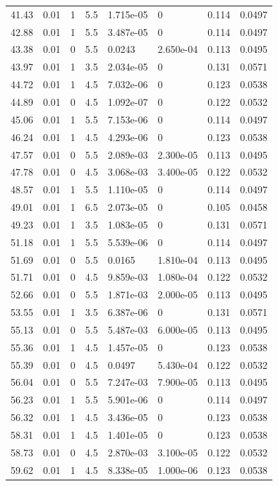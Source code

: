 \documentclass[preview]{standalone}
\begin{document}
{{{\begin{tabular}{L{1.2cm}C{1.2cm} C{0.3cm}C{0.5cm} C{1.4cm}C{1.4cm} C{1.4cm}C{1.4cm}}
  41.43  &  0.01  & 1     & 5.5 &  1.715e-05  & 0  & 0.114 &  0.0497   \\ 
  42.88  &  0.01  & 1     & 5.5 &  3.487e-05  & 0  & 0.114 &  0.0497   \\ 
  43.38  &  0.01  & 0     & 5.5 &  0.0243  & 2.650e-04  & 0.113 &  0.0495   \\ 
  43.97  &  0.01  & 1     & 3.5 &  2.034e-05  & 0  & 0.131 &  0.0571   \\ 
  44.72  &  0.01  & 1     & 4.5 &  7.032e-06  & 0  & 0.123 &  0.0538   \\ 
  44.89  &  0.01  & 0     & 4.5 &  1.092e-07  & 0  & 0.122 &  0.0532   \\ 
  45.06  &  0.01  & 1     & 5.5 &  7.153e-06  & 0  & 0.114 &  0.0497   \\ 
  46.24  &  0.01  & 1     & 4.5 &  4.293e-06  & 0  & 0.123 &  0.0538   \\ 
  47.57  &  0.01  & 0     & 5.5 &  2.089e-03  & 2.300e-05  & 0.113 &  0.0495   \\ 
  47.78  &  0.01  & 0     & 4.5 &  3.068e-03  & 3.400e-05  & 0.122 &  0.0532   \\ 
  48.57  &  0.01  & 1     & 5.5 &  1.110e-05  & 0  & 0.114 &  0.0497   \\ 
  49.01  &  0.01  & 1     & 6.5 &  2.073e-05  & 0  & 0.105 &  0.0458   \\ 
  49.23  &  0.01  & 1     & 3.5 &  1.083e-05  & 0  & 0.131 &  0.0571   \\ 
  51.18  &  0.01  & 1     & 5.5 &  5.539e-06  & 0  & 0.114 &  0.0497   \\ 
  51.69  &  0.01  & 0     & 5.5 &  0.0165  & 1.810e-04  & 0.113 &  0.0495   \\ 
  51.71  &  0.01  & 0     & 4.5 &  9.859e-03  & 1.080e-04  & 0.122 &  0.0532   \\ 
  52.66  &  0.01  & 0     & 5.5 &  1.871e-03  & 2.000e-05  & 0.113 &  0.0495   \\ 
  53.55  &  0.01  & 1     & 3.5 &  6.387e-06  & 0  & 0.131 &  0.0571   \\ 
  55.13  &  0.01  & 0     & 5.5 &  5.487e-03  & 6.000e-05  & 0.113 &  0.0495   \\ 
  55.36  &  0.01  & 1     & 4.5 &  1.457e-05  & 0  & 0.123 &  0.0538   \\ 
  55.39  &  0.01  & 0     & 4.5 &  0.0497  & 5.430e-04  & 0.122 &  0.0532   \\ 
  56.04  &  0.01  & 0     & 5.5 &  7.247e-03  & 7.900e-05  & 0.113 &  0.0495   \\ 
  56.23  &  0.01  & 1     & 5.5 &  5.901e-06  & 0  & 0.114 &  0.0497   \\ 
  56.32  &  0.01  & 1     & 4.5 &  3.436e-05  & 0  & 0.123 &  0.0538   \\ 
  58.31  &  0.01  & 1     & 4.5 &  1.401e-05  & 0  & 0.123 &  0.0538   \\ 
  58.73  &  0.01  & 0     & 4.5 &  2.870e-03  & 3.100e-05  & 0.122 &  0.0532   \\ 
  59.62  &  0.01  & 1     & 4.5 &  8.338e-05  & 1.000e-06  & 0.123 &  0.0538   \\ 
\hline 
\end{tabular} 

}}}
\end{document}
